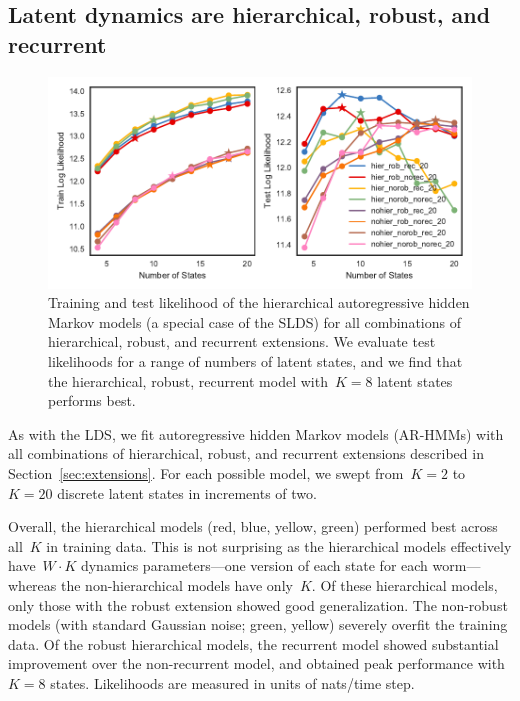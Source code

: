 \documentclass{article}
\begin{document}
\clearpage

\subsection{Latent dynamics are hierarchical, robust, and recurrent}

\begin{figure}[h]
\centering%
\includegraphics[width=\textwidth]{figures/arhmm/dimensionality.pdf} 
\caption{Training and test likelihood of the hierarchical
  autoregressive hidden Markov models (a special case of the SLDS) for
  all combinations of hierarchical, robust, and recurrent extensions.
  We evaluate test likelihoods for a range of numbers of latent
  states, and we find that the hierarchical, robust, recurrent model
  with~$K=8$ latent states performs best.}
\label{fig:arhmm_lls}
\end{figure}

As with the LDS, we fit autoregressive hidden Markov models (AR-HMMs)
with all combinations of hierarchical, robust, and recurrent extensions
described in Section~\ref{sec:extensions}.  For each possible model, we
swept from~$K=2$ to~$K=20$ discrete latent states in increments of two.

Overall, the hierarchical models (red, blue, yellow, green) performed
best across all~$K$ in training data.  This is not surprising as the
hierarchical models effectively have~$W \cdot K$ dynamics
parameters---one version of each state for each worm---whereas the
non-hierarchical models have only~$K$.  Of these hierarchical models,
only those with the robust extension showed good generalization.  The
non-robust models (with standard Gaussian noise; green, yellow)
severely overfit the training data.  Of the robust hierarchical models,
the recurrent model showed substantial improvement over the non-recurrent
model, and obtained peak performance with~$K=8$ states.  Likelihoods
are measured in units of nats/time step.
\end{document}
